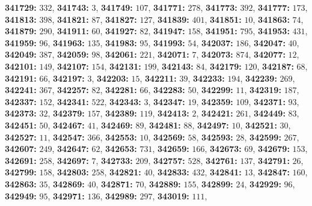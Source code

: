 \textsf{\bfseries 341729:} $332$, \textsf{\bfseries 341743:} $3$, \textsf{\bfseries 341749:} $107$, \textsf{\bfseries 341771:} $278$, \textsf{\bfseries 341773:} $392$, \textsf{\bfseries 341777:} $173$, \textsf{\bfseries 341813:} $398$, \textsf{\bfseries 341821:} $87$, \textsf{\bfseries 341827:} $127$, \textsf{\bfseries 341839:} $401$, \textsf{\bfseries 341851:} $10$, \textsf{\bfseries 341863:} $74$, \textsf{\bfseries 341879:} $290$, \textsf{\bfseries 341911:} $60$, \textsf{\bfseries 341927:} $82$, \textsf{\bfseries 341947:} $158$, \textsf{\bfseries 341951:} $795$, \textsf{\bfseries 341953:} $431$, \textsf{\bfseries 341959:} $96$, \textsf{\bfseries 341963:} $135$, \textsf{\bfseries 341983:} $95$, \textsf{\bfseries 341993:} $54$, \textsf{\bfseries 342037:} $186$, \textsf{\bfseries 342047:} $40$, \textsf{\bfseries 342049:} $387$, \textsf{\bfseries 342059:} $98$, \textsf{\bfseries 342061:} $221$, \textsf{\bfseries 342071:} $7$, \textsf{\bfseries 342073:} $874$, \textsf{\bfseries 342077:} $12$, \textsf{\bfseries 342101:} $149$, \textsf{\bfseries 342107:} $154$, \textsf{\bfseries 342131:} $199$, \textsf{\bfseries 342143:} $84$, \textsf{\bfseries 342179:} $120$, \textsf{\bfseries 342187:} $68$, \textsf{\bfseries 342191:} $66$, \textsf{\bfseries 342197:} $3$, \textsf{\bfseries 342203:} $15$, \textsf{\bfseries 342211:} $39$, \textsf{\bfseries 342233:} $194$, \textsf{\bfseries 342239:} $269$, \textsf{\bfseries 342241:} $367$, \textsf{\bfseries 342257:} $82$, \textsf{\bfseries 342281:} $66$, \textsf{\bfseries 342283:} $50$, \textsf{\bfseries 342299:} $11$, \textsf{\bfseries 342319:} $187$, \textsf{\bfseries 342337:} $152$, \textsf{\bfseries 342341:} $522$, \textsf{\bfseries 342343:} $3$, \textsf{\bfseries 342347:} $19$, \textsf{\bfseries 342359:} $109$, \textsf{\bfseries 342371:} $93$, \textsf{\bfseries 342373:} $32$, \textsf{\bfseries 342379:} $157$, \textsf{\bfseries 342389:} $119$, \textsf{\bfseries 342413:} $2$, \textsf{\bfseries 342421:} $261$, \textsf{\bfseries 342449:} $83$, \textsf{\bfseries 342451:} $50$, \textsf{\bfseries 342467:} $41$, \textsf{\bfseries 342469:} $89$, \textsf{\bfseries 342481:} $88$, \textsf{\bfseries 342497:} $10$, \textsf{\bfseries 342521:} $30$, \textsf{\bfseries 342527:} $11$, \textsf{\bfseries 342547:} $366$, \textsf{\bfseries 342553:} $10$, \textsf{\bfseries 342569:} $58$, \textsf{\bfseries 342593:} $28$, \textsf{\bfseries 342599:} $267$, \textsf{\bfseries 342607:} $249$, \textsf{\bfseries 342647:} $62$, \textsf{\bfseries 342653:} $731$, \textsf{\bfseries 342659:} $166$, \textsf{\bfseries 342673:} $69$, \textsf{\bfseries 342679:} $153$, \textsf{\bfseries 342691:} $258$, \textsf{\bfseries 342697:} $7$, \textsf{\bfseries 342733:} $209$, \textsf{\bfseries 342757:} $528$, \textsf{\bfseries 342761:} $137$, \textsf{\bfseries 342791:} $26$, \textsf{\bfseries 342799:} $158$, \textsf{\bfseries 342803:} $258$, \textsf{\bfseries 342821:} $40$, \textsf{\bfseries 342833:} $432$, \textsf{\bfseries 342841:} $13$, \textsf{\bfseries 342847:} $160$, \textsf{\bfseries 342863:} $35$, \textsf{\bfseries 342869:} $40$, \textsf{\bfseries 342871:} $70$, \textsf{\bfseries 342889:} $155$, \textsf{\bfseries 342899:} $24$, \textsf{\bfseries 342929:} $96$, \textsf{\bfseries 342949:} $95$, \textsf{\bfseries 342971:} $136$, \textsf{\bfseries 342989:} $297$, \textsf{\bfseries 343019:} $111$, 
